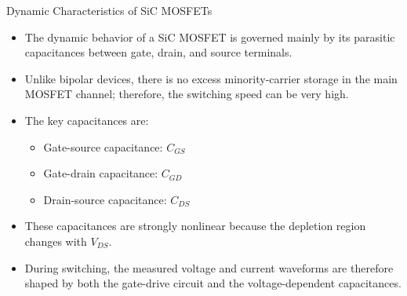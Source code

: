 \begin{frame}{Dynamic Characteristics of SiC MOSFETs}
\begin{itemize}
    \item The dynamic behavior of a SiC MOSFET is governed mainly by its parasitic capacitances between gate, drain, and source terminals.
    \item Unlike bipolar devices, there is no excess minority-carrier storage in the main MOSFET channel; therefore, the switching speed can be very high.
    \item The key capacitances are:
    \begin{itemize}
        \item Gate-source capacitance: $C_{GS}$
        \item Gate-drain capacitance: $C_{GD}$
        \item Drain-source capacitance: $C_{DS}$
    \end{itemize}
    \item These capacitances are strongly nonlinear because the depletion region changes with $V_{DS}$.
    \item During switching, the measured voltage and current waveforms are therefore shaped by both the gate-drive circuit and the voltage-dependent capacitances.
\end{itemize}
\end{frame}




